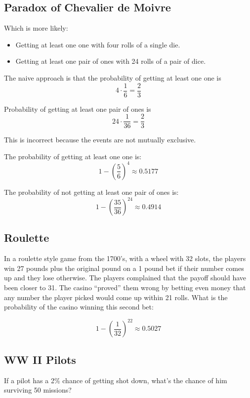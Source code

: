 \documentclass[landscape]{exam}
\begin{document}
  \subsection{Paradox of Chevalier de Moivre}

  Which is more likely:
  \begin{itemize}
    \item Getting at least one one with four rolls of a single die.
    \item Getting at least one pair of ones with 24 rolls of a pair of dice.
  \end{itemize}

  The naive approach is that the probability of getting at least one one is
  \[
    4 \cdot \frac{1}{6} = \frac{2}{3}
  \]

  Probability of getting at least one pair of ones is
  \[
    24 \cdot \frac{1}{36} = \frac{2}{3}
  \]

  This is incorrect because the events are not mutually exclusive.

  \begin{solution}
    The probability of getting at least one one is:
    \[
      1 - \left( \frac{5}{6} \right)^4 \approx 0.5177
    \]

    The probability of not getting at least one pair of ones is:
    \[
      1 - \left( \frac{35}{36} \right)^{24} \approx 0.4914
    \]
  \end{solution}

  \subsection{Roulette}
  In a roulette style game from the 1700's, with a wheel with 32 slots, the
  players win 27 pounds plus the original pound on a 1 pound bet if their number
  comes up and they lose otherwise. The players complained that the payoff
  should have been closer to 31. The casino ``proved'' them wrong by betting
  even money that any number the player picked would come up within 21 rolls.
  What is the probability of the casino winning this second bet:

  \begin{solution}
    \[
      1 - \left( \frac{1}{32} \right)^{22} \approx 0.5027
    \]
  \end{solution}

  \subsection{WW II Pilots}
  If a pilot has a 2\% chance of getting shot down, what's the chance of him
  surviving 50 missions?
\end{document}
